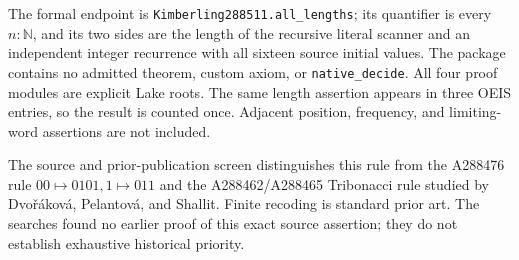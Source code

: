 The formal endpoint is
\texttt{Kimberling288511.all\_lengths}; its quantifier is every $n:\mathbb N$,
and its two sides are the length of the recursive literal scanner and
an independent integer recurrence with all sixteen source initial values.
The package contains no admitted theorem, custom axiom, or
\texttt{native\_decide}. All four proof modules are explicit Lake roots.
The same length assertion appears in three OEIS entries, so the result
is counted once. Adjacent position, frequency, and limiting-word
assertions are not included.

The source and prior-publication screen distinguishes this rule from
the A288476 rule $00\mapsto0101,1\mapsto011$ and the
A288462/A288465 Tribonacci rule studied by Dvo\v r\'akov\'a,
Pelantov\'a, and Shallit. Finite recoding is standard prior art.
The searches found no earlier proof of this exact source assertion;
they do not establish exhaustive historical priority.

